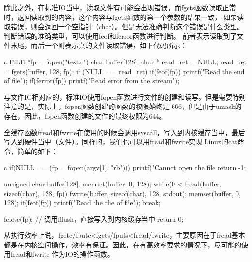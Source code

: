 除此之外，在标准IO当中，读取文件有可能会出现错误，而fgets函数读取正常时，返回读取到的内容，这个内容与fgets函数的第一个参数的结果一致，
如果读取错误，则会返回一个空指针（char）。但是无法准确判断这个错误是什么类型。判断错误的准确类型，可以使用feof和ferror函数进行判断。
前者表示读取到了文件末尾，而后一个则表示真的文件读取错误，如下代码所示：
\begin{code-block}{c}
FILE *fp = fopen("test.c")
char buffer[128];
char * read_ret = NULL;
read_ret = fgets(buffer, 128, fp);
if (NULL == read_ret)
{
        if(feof(fp))
        {
                printf("Read the end of file\n");
        }
        if(ferror(fp))
        {
                printf("Read error from the stream\n");
        }
}
\end{code-block}

与文件IO相对应的，标准IO使用fopen函数进行文件的创建和读写。但是需要特别注意的是，实际上，fopen函数创建的函数的权限始终是
666，但是由于umask的存在，因此，fopen函数创建的文件的最终权限为644。

全缓存函数fread和fwrite在使用的时候会调用syscall，写入到内核缓存当中，最后写入到硬件当中（文件）。同样的，我们也可以用fread和fwrite实现
Linux的cat命令，简单的如下：
\begin{code-block}{c}
if(NULL == (fp = fopen(argv[1], "rb")))
{
        printf("Cannot open the file %
        return -1;
}

unsigned char buffer[128];
memset(buffer, 0, 128);
while(0 < fread(buffer, sizeof(char), 128, fp))
{
        fwrite(buffer, sizeof(char), 128, stdout);
        memset(buffer, 0, 128);
        if(feof(fp))
        {
                printf("Read the the of file\n");
                break;
        }
}

fclose(fp); // 调用fflush，直接写入到内核缓存当中
return 0;
\end{code-block}

从执行效率上说，fgetc/fputc<fgets/fputs<fread/fwrite，主要原因在于fread基本都是在内核空间操作，效率有保证。因此，在有高效率要求的情况下，尽可能的使用fread和fwrite
作为IO的操作函数。


